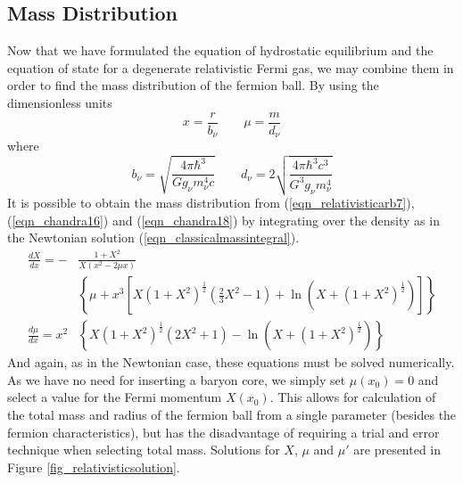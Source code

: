 \subsection{Mass Distribution}
\label{sec_relatmassdist}
Now that we have formulated the equation of hydrostatic equilibrium and the equation of state for a degenerate relativistic Fermi gas,
we may combine them in order to find the mass distribution of the fermion ball. By using the dimensionless units
\begin{equation}
	x=\frac{r}{b_\nu} \qquad \mu = \frac{m}{d_\nu}
	\label{eqn_relatmassdistunits}
\end{equation}
where
\begin{equation}
	b_\nu = \sqrt{\frac{4 \pi \hbar^3}{G g_\nu m_\nu^4 c}} \qquad d_\nu = 2\sqrt{\frac{4 \pi \hbar^3 c^3}{G^3 g_\nu m_\nu^4}}
	\label{eqn_relatdimensionless}
\end{equation}
It is possible to obtain the mass distribution from (\ref{eqn_relativisticarb7}), (\ref{eqn_chandra16}) and (\ref{eqn_chandra18}) by
integrating over the density as in the Newtonian solution (\ref{eqn_classicalmassintegral}).
\begin{align}
	\frac{dX}{dx} = - &\frac{1+X^2}{X\left(x^2 - 2\mu x\right)} \nonumber \\
			  &\left\{ \mu +x^3 \left[ X\left(1+X^2\right)^{\frac{1}{2}}
			  \left(\frac{2}{3}X^2-1\right) + \ln \left(X + \left( 1+X^2\right)^{\frac{1}{2}} \right)\right]\right\}
	\label{eqn_relativisticxsolution} \\
	\frac{d\mu}{dx} = x^2&\left\{ X\left( 1+X^2\right)^{\frac{1}{2}} \left(2X^2+1\right)
			  - \ln \left(X + \left( 1+X^2\right)^{\frac{1}{2}} \right)\right\}
	\label{eqn_relativisticmusolution}
\end{align}
And again, as in the Newtonian case, these equations must be solved numerically. As we have no
need for inserting a baryon core, we simply set $\mu(x_0)=0$ and select a value for the Fermi momentum $X(x_0)$. This allows for calculation
of the total mass and radius of the fermion ball from a single parameter (besides the fermion characteristics), but has the
disadvantage of requiring a trial and error technique when selecting total mass. Solutions for $X$, $\mu$ and $\mu'$ are presented in
Figure \ref{fig_relativisticsolution}.
